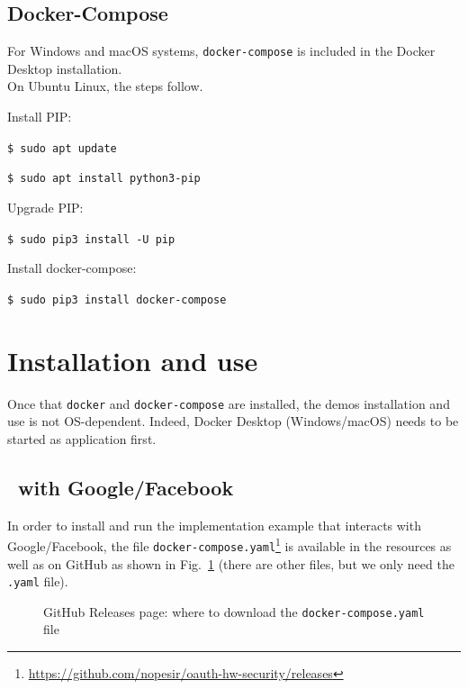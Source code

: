 \subsection{Docker-Compose}
For Windows and macOS systems, \texttt{docker-compose} is included in the Docker Desktop installation.\\
On Ubuntu Linux, the steps follow.

\noindent Install PIP:

  \texttt{\$ sudo apt update}
  
  \texttt{\$ sudo apt install python3-pip}

\noindent Upgrade PIP:

  \texttt{\$ sudo pip3 install -U pip}

\noindent Install docker-compose:
  
  \texttt{\$ sudo pip3 install docker-compose}



\section{Installation and use}
Once that \texttt{docker} and \texttt{docker-compose} are installed, the demos installation and use is not OS-dependent. Indeed, Docker Desktop (Windows/macOS) needs to be started as application first.

\subsection{\oauth\ with Google/Facebook}
In order to install and run the implementation example that interacts with Google/Facebook, the file \texttt{docker-compose.yaml}\footnote{\url{https://github.com/nopesir/oauth-hw-security/releases}} is available in the resources as well as on GitHub as shown in Fig.~\ref{fig:rel1} (there are other files, but we only need the \texttt{.yaml} file).

\begin{figure}[h!]
    \centering
    \caption{GitHub Releases page: where to download the \texttt{docker-compose.yaml} file}
    \label{fig:rel1}
\end{figure}

